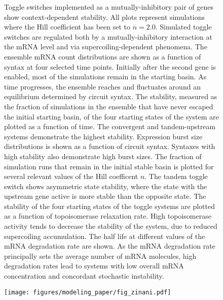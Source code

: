 \documentclass[11pt]{article}
\begin{document}
\begin{figure}[htbp]
    \ContinuedFloat
    \caption{Toggle switches implemented as a mutually-inhibitory pair of genes show context-dependent stability. All plots represent simulations where the Hill coefficient has been set to \(n = 2.0\).
     Simulated toggle switches are regulated both by a mutually-inhibitory interaction at the mRNA level and via supercoiling-dependent phenomena.
     The ensemble mRNA count distributions are shown as a function of syntax at four selected time points. Initially after the second gene is enabled, most of the simulations remain in the starting basin. As time progresses, the ensemble reaches and fluctuates around an equilibrium determined by circuit syntax.
     The stability, measured as the fraction of simulations in the ensemble that have never escaped the initial starting basin, of the four starting states of the system are plotted as a function of time. The convergent and tandem-upstream systems demonstrate the highest stability.
     Expression burst size distributions is shown as a function of circuit syntax. Syntaxes with high stability also demonstrate high burst sizes.
     The fraction of simulation runs that remain in the initial stable basin is plotted for several relevant values of the Hill coefficent \(n\). The tandem toggle switch shows asymmetric state stability, where the state with the upstream gene active is more stable than the opposite state.
     The stability of the four starting states of the toggle systems are plotted as a function of topoisomerase relaxation rate. High topoisomerase activity tends to decrease the stability of the system, due to reduced supercoiling accumulation.
     The half life at different values of the mRNA degradation rate are shown. As the mRNA degradation rate principally sets the average number of mRNA molecules, high degradation rates lead to systems with low overall mRNA concentration and concordant stochastic instability.
} \label{fig:top:toggle_switch}
\end{figure}
\begin{figure}[htbp]
    \centering
    {\texttt{[image: figures/modeling\_paper/fig\_zinani.pdf]}
    \label{fig:her1_her7_cartoon}
    \label{fig:zinani_summary_cartoon}
    \label{fig:zinani_mRNA_behavior}
    \label{fig:zinani_correlation_coeff}
    \label{fig:zinani_oscillation_amplitude}
    \label{fig:zinani_cross_correlation}
    }
\end{figure}
\end{document}
